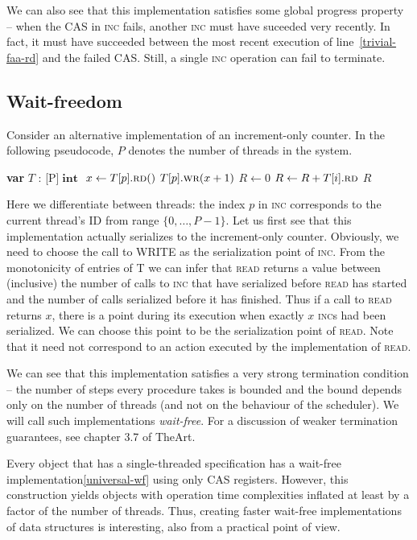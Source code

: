 \documentclass[a4paper,11pt]{article}
\def\int{\ensuremath{\operatorname{\textbf{int}}}}
\newcommand{\fn}[1]{\textsc{#1}}
\newcommand{\var}[2]{\textbf{var }#1 : #2}
\newcommand{\arrayspec}[1]{\text{array}[#1]\text{ of }}
\begin{document}
We can also see that this implementation satisfies some global progress property -- when the CAS in \fn{inc} fails,
another \fn{inc} must have suceeded very recently. In fact, it must have succeeded between the most recent execution
of line~\ref{trivial-faa-rd} and the failed CAS. Still, a single \fn{inc} operation can fail to terminate.

\subsection{Wait-freedom}

Consider an alternative implementation of an increment-only counter. In the following pseudocode, $P$ denotes
the number of threads in the system.

\begin{algorithmic}[1]
	\State\var{$T$}{\arrayspec{P}$\int$} \Comment{T is an array of $P$ CAS objects of type \int}
	\State $x \gets T[p].\fn{rd}()$
	\State $T[p].\fn{wr}(x + 1)$
\EndFunction
{}
	\State $R \gets 0$
	\State $R \gets R + T[i].\fn{rd}$
	\EndFor
	\State\Return $R$
\EndFunction
\end{algorithmic}

Here we differentiate between threads: the index $p$ in \fn{inc} corresponds to the current thread's ID from range
$\{0, \ldots, P-1\}$. Let us first see that this implementation actually serializes to the increment-only counter.
Obviously, we need to choose the call to WRITE as the serialization point of \fn{inc}. From the monotonicity
of entries of T we can infer that \fn{read} returns a value between (inclusive) the number of calls to \fn{inc} that have
serialized before \fn{read} has started and the number of calls serialized before it has finished.
Thus if a call to \fn{read} returns $x$, there is a point during its
execution when exactly $x$ \fn{inc}s had been serialized. We can choose this point to be the serialization point of
\fn{read}. Note that it need not correspond to an action executed by the implementation of \fn{read}.

We can see that this implementation satisfies a very strong termination condition -- the number of steps every
procedure takes is bounded and the bound depends only on the number of threads (and not on the behaviour of
the scheduler). We will call such implementations \emph{wait-free}. For a discussion of weaker
termination guarantees, see chapter 3.7 of TheArt.

Every object that has a single-threaded specification has a wait-free implementation\ref{universal-wf} using
only CAS registers.
However, this construction yields objects with operation time complexities inflated at least by a factor
of the number of threads.
Thus, creating faster wait-free implementations of data structures is interesting, also from a practical
point of view.
\end{document}
